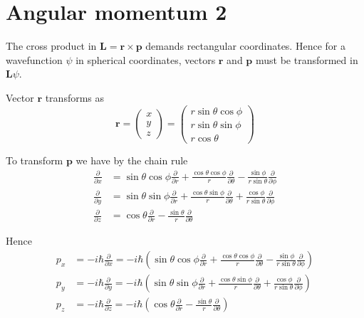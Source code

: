

\section*{Angular momentum 2}

The cross product in $\mathbf L=\mathbf r\times\mathbf p$
demands rectangular coordinates.
Hence for a wavefunction $\psi$ in spherical coordinates,
vectors $\mathbf r$ and $\mathbf p$
must be transformed in $\mathbf L\psi$.

\bigskip
Vector $\mathbf r$ transforms as
\begin{equation*}
\mathbf r=\begin{pmatrix}x\\y\\z\end{pmatrix}
=\begin{pmatrix}
r\sin\theta\cos\phi
\\
r\sin\theta\sin\phi
\\
r\cos\theta
\end{pmatrix}
\end{equation*}

To transform $\mathbf p$ we have by the chain rule
\begin{align*}
%
%
\frac{\partial}{\partial x}
&=\sin\theta\cos\phi\frac{\partial}{\partial r}
+\frac{\cos\theta\cos\phi}{r}\frac{\partial}{\partial\theta}
-\frac{\sin\phi}{r\sin\theta}\frac{\partial}{\partial\phi}
\\[1ex]
%
%
\frac{\partial}{\partial y}
&=\sin\theta\sin\phi\frac{\partial}{\partial r}
+\frac{\cos\theta\sin\phi}{r}\frac{\partial}{\partial\theta}
+\frac{\cos\phi}{r\sin\theta}\frac{\partial}{\partial\phi}
\\[1ex]
%
%
\frac{\partial}{\partial z}
&=\cos\theta\frac{\partial}{\partial r}
-\frac{\sin\theta}{r}\frac{\partial}{\partial\theta}
\end{align*}

Hence
\begin{align*}
p_x&=-i\hbar\frac{\partial}{\partial x}=-i\hbar\left(
\sin\theta\cos\phi\frac{\partial}{\partial r}
+\frac{\cos\theta\cos\phi}{r}\frac{\partial}{\partial\theta}
-\frac{\sin\phi}{r\sin\theta}\frac{\partial}{\partial\phi}
\right)
\\[1ex]
p_y&=-i\hbar\frac{\partial}{\partial y}=-i\hbar\left(
\sin\theta\sin\phi\frac{\partial}{\partial r}
+\frac{\cos\theta\sin\phi}{r}\frac{\partial}{\partial\theta}
+\frac{\cos\phi}{r\sin\theta}\frac{\partial}{\partial\phi}
\right)
\\[1ex]
p_z&=-i\hbar\frac{\partial}{\partial z}=-i\hbar\left(
\cos\theta\frac{\partial}{\partial r}
-\frac{\sin\theta}{r}\frac{\partial}{\partial\theta}
\right)
\end{align*}

